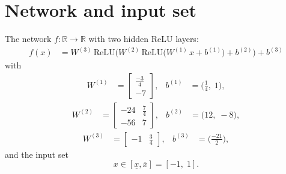 \documentclass[11pt]{article}
\begin{document}
\section{Network and input set}
The network $f:\mathbb{R} \to \mathbb{R}$ with two hidden ReLU layers:
\begin{align*}
f(x) &= W^{(3)}\,\mathrm{ReLU}\bigl(W^{(2)}\,\mathrm{ReLU}\bigl(W^{(1)}\,x + b^{(1)}\bigr) + b^{(2)}\bigr) + b^{(3)}
\end{align*}
with
\begin{align*}
W^{(1)} &= \begin{bmatrix}
\frac{-3}{4} \\
-7
\end{bmatrix}, & b^{(1)} &= \bigl(\frac{1}{4},\; 1\bigr),
\end{align*}
\begin{align*}
W^{(2)} &= \begin{bmatrix}
-24 & \frac{7}{4} \\
-56 & 7
\end{bmatrix}, & b^{(2)} &= \bigl(12,\; -8\bigr),
\end{align*}
\begin{align*}
W^{(3)} &= \begin{bmatrix}
-1 & \frac{3}{4}
\end{bmatrix}, & b^{(3)} &= \bigl(\frac{-21}{2}\bigr),
\end{align*}
and the input set
\begin{equation*}
 x \in [\underline{x}, \overline{x}] = [-1,\; 1].
\end{equation*}
\end{document}
